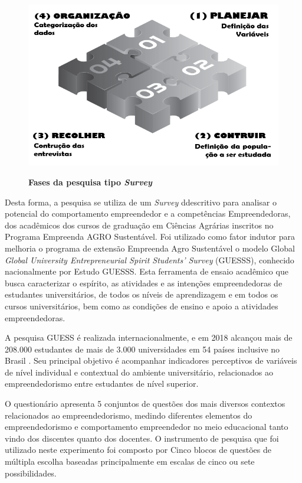 \begin{figure}[H]
\centering
\caption{\textbf{Fases da pesquisa tipo \textit{Survey}}}
\includegraphics[scale=0.5]{Imagens/survey.png}
\label{figura_8}
\end{figure}

Desta forma, a pesquisa se utiliza de um \textit{Survey} ddescritivo para analisar o potencial do comportamento empreendedor e a competências Empreendedoras, dos acadêmicos dos cursos de graduação em Ciências Agrárias inscritos no Programa Empreenda AGRO Sustentável. Foi utilizado como fator indutor para melhoria o programa de extensão Empreenda Agro Sustentável o modelo Global \textit{Global University Entrepreneurial Spirit Students’ Survey} (GUESSS), conhecido nacionalmente por Estudo GUESSS. Esta ferramenta de ensaio acadêmico que busca caracterizar o espírito, as atividades e as intenções empreendedoras de estudantes universitários, de todos os níveis de aprendizagem e em todos os cursos universitários, bem como as condições de ensino e apoio a atividades empreendedoras. 

A pesquisa GUESS é realizada internacionalmente, e em 2018 alcançou mais de 208.000 estudantes de mais de 3.000 universidades em 54 países inclusive no Brasil \cite{sieger_global_2018}.  Seu  principal  objetivo  é  acompanhar  indicadores perceptivos   de   variáveis   de   nível individual   e   contextual   do   ambiente   universitário, relacionados ao empreendedorismo entre estudantes de nível superior.

O questionário apresenta 5 conjuntos de questões dos mais diversos contextos relacionados ao empreendedorismo, medindo diferentes elementos do empreendedorismo e comportamento empreendedor no meio educacional tanto vindo dos discentes quanto dos docentes. O instrumento de pesquisa que foi utilizado neste experimento foi composto por Cinco blocos de questões de múltipla escolha baseadas principalmente em escalas de cinco ou sete possibilidades.

